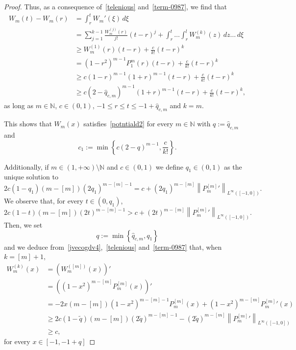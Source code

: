 \documentclass[12pt]{article}
\newcommand{\N}{\mathbb{N}}
\numberwithin{equation}{section}
\renewcommand{\leq}{\leqslant}
\renewcommand{\geq}{\geqslant}
\begin{document}
\begin{appendix}
\begin{proof}
Thus, as a consequence of~\eqref{telenious} and~\eqref{term-0987},
we find that 
\begin{equation*}
\begin{split}
W_m(t)-W_m(r)&=\int_{r}^tW_m'(\xi)\,d\xi\\
&=\sum_{j=1}^{k-1} \frac{W_m^{(j)}(r)}{j!}(t-r)^j+\int_{r}^t\dots \int_{r}^l W_m^{(k)}(z)\,dz\dots\,d\xi\\
&\geq W_m^{(1)}(r)(t-r)  + \frac{c}{k!}(t-r)^k\\
&=(1-r^2)^{m-1}P_1^m(r)(t-r)+\frac{c}{k!}(t-r)^k\\
&\geq c(1-r)^{m-1}(1+r)^{m-1}(t-r)+\frac{c}{k!}(t-r)^k\\
&\geq c(2-\hat{q}_{c,m})^{m-1}(1+r)^{m-1}(t-r)+\frac{c}{k!}(t-r)^k,
\end{split}
\end{equation*}
as long as $m\in \N$, $c\in (0,1)$, $-1\leq r\leq t\leq -1+\hat{q}_{c,m}$ and $k=m$.

This shows that $W_m(x)$ satisfies~\eqref{potntiald2} for every $m\in\N$  with $q:=\hat{q}_{c,m}$ and 
\begin{equation}\label{c_1}
c_1:=\min\left\lbrace  c(2-q)^{m-1} ,\frac{c}{k!}    \right\rbrace.
\end{equation}

Additionally, if $m\in (1,+\infty)\setminus \N$ and $c\in (0,1)$ we define $q_1\in (0,1)$ as the unique solution to 
\begin{equation*}
2c(1-q_1)(m-\left[m\right])(2 q_1)^{m-\left[m\right]-1} =c+ (2 q_1)^{m-\left[m\right]}\left\|{P_m^{\left[m\right]}}'\right\|_{L^\infty([-1,0])}.
\end{equation*}
We observe that, for every $t\in (0,q_1)$, 
\begin{equation}\label{jvecogdv4}
2c(1-t)(m-\left[m\right])(2 t)^{m-\left[m\right]-1}>c+ (2 t)^{m-\left[m\right]}\left\|{P_m^{\left[m\right]}}'\right\|_{L^\infty([-1,0])}.
\end{equation}
Then, we set  
\begin{equation}\label{eq!}
q:=\min \left\lbrace \hat{q}_{c,m}, q_1  \right\rbrace
\end{equation}
and we deduce from~\eqref{jvecogdv4},~\eqref{telenious} and~\eqref{term-0987} that,
when $k=\left[m\right]+1$,
\begin{equation*}
\begin{split}
W_m^{(k)}(x)&=\left(W_m^{([m])}(x)\right)'\\
&=\left((1-x^2)^{m-\left[m\right]}P_m^{\left[m\right]}(x)\right)'\\
&=-2x(m-\left[m\right])\left(1-x^2\right)^{m-\left[m\right]-1}P_m^{\left[m\right]}(x)+ (1-x^2)^{m-\left[m\right]}{P_m^{\left[m\right]}}'(x)\\
&\geq 2c(1-\tilde{q})(m-\left[m\right])(2\tilde{q})^{m-\left[m\right]-1}-(2\tilde{q})^{m-\left[m\right]}\left\|{P_m^{\left[m\right]}}'\right\|_{L^\infty([-1,0])}\\
&\geq c,
\end{split}
\end{equation*}
for every $x\in [-1,-1+q]$


\end{proof}
\end{appendix}
\end{document}
